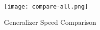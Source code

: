 \begin{figure}[ht]
    \centering
    \texttt{[image: compare-all.png]}
    \caption{Generalizer Speed Comparison}\label{fig:compare_all}
\end{figure}